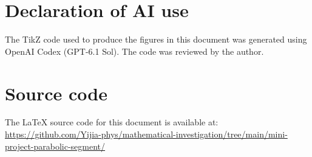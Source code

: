 \documentclass[a4paper,11pt]{article}
\theoremstyle{definition}
\begin{document}
\section*{Declaration of AI use}
The TikZ code used to produce the figures in this document
was generated using OpenAI Codex (GPT-6.1 Sol). The code was reviewed by the author.

\section*{Source code}
The LaTeX source code for this document is available at:
\url{https://github.com/Yijia-phys/mathematical-investigation/tree/main/mini-project-parabolic-segment/}
\end{document}
